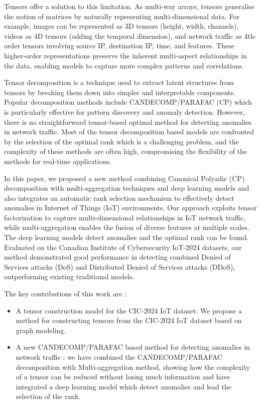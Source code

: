 \documentclass[pdflatex,sn-mathphys-num]{sn-jnl}
\theoremstyle{thmstyleone}
\theoremstyle{thmstyletwo}
\theoremstyle{thmstylethree}
\begin{document}
Tensors offer a solution to this limitation. As multi-way arrays, tensors generalise the notion of matrices by naturally representing multi-dimensional data. For example, images can be represented as 3D tensors (height, width, channels), videos as 4D tensors (adding the temporal dimension), and network traffic as 4th-order tensors involving source IP, destination IP, time, and features. These higher-order representations preserve the inherent multi-aspect relationships in the data, enabling models to capture more complex patterns and correlations. 

Tensor decomposition is a technique used to extract latent structures from tensors by breaking them down into simpler and interpretable components. Popular decomposition methods include CANDECOMP/PARAFAC (CP) \cite{kolda2009tensor} which is particularly effective for pattern discovery and anomaly detection.
However, there is no straightforward tensor-based optimal method for detecting anomalies in network traffic. Most of the tensor decomposition based models are confronted by the selection of the optimal rank which is a challenging problem, and the complexity of these methods are often high, compromising the flexibility of the methods for real-time applications.


In this paper, we proposed a new method combining Canonical Polyadic (CP) decomposition with multi-aggregation techniques and deep learning models and also integrates an automatic rank selection mechanism to effectively detect anomalies in Internet of Things (IoT) environments. Our approach exploits tensor factorization to capture multi-dimensional relationships in IoT network traffic, while multi-aggregation enables the fusion of diverse features at multiple scales. The deep learning models detect anomalies and the optimal rank can be found. Evaluated on the Canadian Institute of Cybersecurity IoT-2024 datasets, our method demonstrated good performance in detecting combined Denied of Services attacks (DoS) and Distributed Denied of Services attacks (DDoS), outperforming existing traditional models.

 
The key contributions of this work are :
\begin{itemize}
    \item A tensor construction model for the CIC-2024 IoT dataset: We propose a method for constructing tensors from the CIC-2024 IoT dataset based on graph modeling.
    
    \item A new CANDECOMP/PARAFAC based method for detecting anomalies in network traffic : we have combined the CANDECOMP/PARAFAC decomposition with Multi-aggregation method, showing how the complexity of a tensor can be reduced without losing much information and have integrated a deep learning model which detect anomalies and lead the selection of the rank.

\end{itemize}
\end{document}

